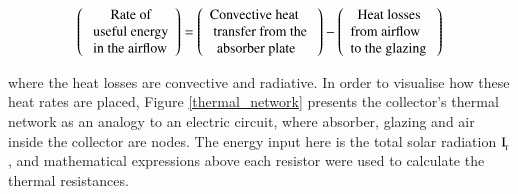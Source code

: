 \begin{equation*}
	\left( \begin{array}{l}
		{\rm{\ \ \ \ \ \ Rate \ of}}\\
		{\rm{\ useful \ energy }}\\
		{\rm{\ in \ the \ airflow}}
	\end{array} \right) = \left( \begin{array}{l}
		{\rm{Convective \ heat}}\\
		{\rm{\ transfer \ from \ the \ }}\\
		{\rm{\ \ absorber \ plate}}
	\end{array} \right) - \left( \begin{array}{l}
		{\rm{\ \ Heat \ losses}}\\
		{\rm{from \ airflow \ }} \\
		{\rm{to \ the \ glazing \ }}
	\end{array} \right) 
	\label{text_equation_air}
\end{equation*}



\noindent where the heat losses are convective and radiative. In order to visualise how these heat rates are placed, Figure \ref{thermal_network} presents the collector's thermal network as an analogy to an electric circuit, where absorber, glazing and air inside the collector are nodes. The energy input here is the total solar radiation $\rm{I_{\!_{T}}}$, and mathematical expressions above each resistor were used to calculate the thermal resistances.


